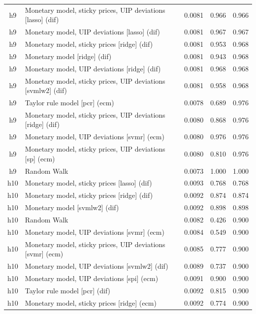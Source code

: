 \begin{ThreePartTable}
\begin{longtable}[t]{cp{5.5cm}ccc}
\addlinespace
h9 & \raggedright Monetary model, sticky prices, UIP deviations [lasso] (dif) & 0.0081 & 0.966 & 0.966\\
h9 & \raggedright Monetary model, UIP deviations [lasso] (dif) & 0.0081 & 0.967 & 0.967\\
h9 & \raggedright Monetary model, sticky prices [ridge] (dif) & 0.0081 & 0.953 & 0.968\\
h9 & \raggedright Monetary model [ridge] (dif) & 0.0081 & 0.943 & 0.968\\
h9 & \raggedright Monetary model, UIP deviations [ridge] (dif) & 0.0081 & 0.968 & 0.968\\
h9 & \raggedright Monetary model, sticky prices, UIP deviations [svmlw2] (dif) & 0.0081 & 0.958 & 0.968\\
h9 & \raggedright Taylor rule model [pcr] (ecm) & 0.0078 & 0.689 & 0.976\\
h9 & \raggedright Monetary model, sticky prices, UIP deviations [ridge] (dif) & 0.0080 & 0.868 & 0.976\\
h9 & \raggedright Monetary model, UIP deviations [svmr] (ecm) & 0.0080 & 0.976 & 0.976\\
h9 & \raggedright Monetary model, sticky prices, UIP deviations [sp] (ecm) & 0.0080 & 0.810 & 0.976\\
h9 & \raggedright Random Walk & 0.0073 & 1.000 & 1.000\\
\addlinespace
h10 & \raggedright Monetary model, sticky prices [lasso] (dif) & 0.0093 & 0.768 & 0.768\\
h10 & \raggedright Monetary model, sticky prices [ridge] (dif) & 0.0092 & 0.874 & 0.874\\
h10 & \raggedright Monetary model [svmlw2] (dif) & 0.0092 & 0.898 & 0.898\\
h10 & \raggedright Random Walk & 0.0082 & 0.426 & 0.900\\
h10 & \raggedright Monetary model, UIP deviations [svmr] (ecm) & 0.0084 & 0.549 & 0.900\\
h10 & \raggedright Monetary model, sticky prices, UIP deviations [svmr] (ecm) & 0.0085 & 0.777 & 0.900\\
h10 & \raggedright Monetary model, UIP deviations [svmlw2] (dif) & 0.0089 & 0.737 & 0.900\\
h10 & \raggedright Monetary model, UIP deviations [spi] (ecm) & 0.0091 & 0.900 & 0.900\\
h10 & \raggedright Taylor rule model [pcr] (dif) & 0.0092 & 0.815 & 0.900\\
h10 & \raggedright Monetary model, sticky prices [ridge] (ecm) & 0.0092 & 0.774 & 0.900\\

\end{longtable}
\end{ThreePartTable}
